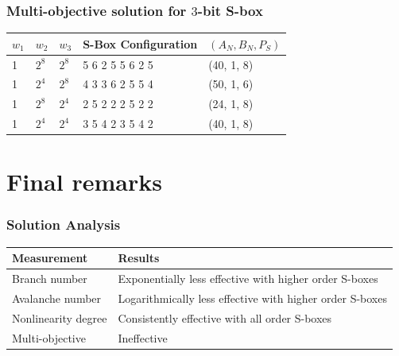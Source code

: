 \documentclass[handout]{beamer}
\begin{document}
\begin{frame}
	\frametitle{Multi-objective solution for $3$-bit S-box}

\begin{table}
	\centering
	\label{jointTable}
    \begin{tabular}{|l|l|l|l|l|}
        \hline
        $w_1$ & $w_2$ & $w_3$ & S-Box Configuration & $(A_N, B_N, P_S)$ \\ \hline
        1 & $2^8$ & $2^8$ & 5     6     2     5     5     6     2     5 & (40, 1, 8) \\ 
        1 & $2^4$ & $2^8$ & 4     3     3     6     2     5     5     4 & (50, 1, 6) \\ 
        1 & $2^8$ & $2^4$ & 2     5     2     2     2     5     2     2 & (24, 1, 8) \\ 
        1 & $2^4$ & $2^4$ & 3     5     4     2     3     5     4     2 & (40, 1, 8) \\ 
        \hline
    \end{tabular}
\end{table}
\end{frame}

\section{Final remarks}
\begin{frame}
	\frametitle{Solution Analysis}
\begin{table}
    \begin{tabular}{|l|p{6cm}|}
        \hline
        \textbf{Measurement} & \textbf{Results} \\ \hline
        Branch number & Exponentially less effective with higher order S-boxes \\ 
        Avalanche number & Logarithmically less effective with higher order S-boxes \\ 
        Nonlinearity degree & Consistently effective with all order S-boxes  \\ \hline
	Multi-objective & Ineffective \\
        \hline
    \end{tabular}
\end{table}
\end{frame}
\end{document}
